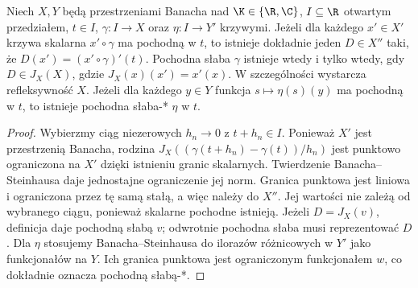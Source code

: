 \begin{twierdzenie}
\label{thm:scalar-curve-derivative14}
Niech $X,Y$ będą przestrzeniami Banacha nad $\K\in\{\R,\C\}$,
$I\subseteq\R$ otwartym przedziałem, $t\in I$,
$\gamma:I\to X$ oraz $\eta:I\to Y'$ krzywymi.
Jeżeli dla każdego $x'\in X'$ krzywa skalarna $x'\circ\gamma$ ma
pochodną w $t$, to istnieje dokładnie jeden $D\in X''$
taki, że $D(x')=(x'\circ\gamma)'(t)$. Pochodna słaba
$\gamma$ istnieje wtedy i tylko wtedy, gdy $D\in J_X(X)$,
gdzie $J_X(x)(x')=x'(x)$. W szczególności wystarcza
refleksywność $X$. Jeżeli dla każdego $y\in Y$ funkcja
$s\mapsto\eta(s)(y)$ ma pochodną w $t$, to istnieje
pochodna słaba-* $\eta$ w $t$.
\end{twierdzenie}
\begin{proof}
Wybierzmy ciąg niezerowych $h_n\to0$ z $t+h_n\in I$.
Ponieważ $X'$ jest przestrzenią Banacha, rodzina $J_X((\gamma(t+h_n)-\gamma(t))/h_n)$ jest
punktowo ograniczona na $X'$ dzięki istnieniu granic
skalarnych. Twierdzenie Banacha--Steinhausa daje
jednostajne ograniczenie jej norm. Granica punktowa
jest liniowa i ograniczona przez tę samą stałą,
a więc należy do $X''$. Jej wartości nie zależą od
wybranego ciągu, ponieważ skalarne pochodne istnieją.
Jeżeli $D=J_X(v)$, definicja daje pochodną słabą $v$;
odwrotnie pochodna słaba musi reprezentować $D$.
Dla $\eta$ stosujemy Banacha--Steinhausa do ilorazów
różnicowych w $Y'$ jako funkcjonałów na $Y$.
Ich granica punktowa jest ograniczonym funkcjonałem
$w$, co dokładnie oznacza pochodną słabą-*.
\end{proof}

